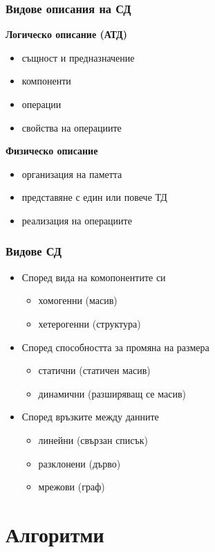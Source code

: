 \documentclass{beamer}
\begin{document}
\begin{frame}
  \frametitle{Видове описания на СД}

  \textbf{Логическо описание (АТД)}
  \begin{itemize}
  \item същност и предназначение
  \item компоненти
  \item операции
  \item свойства на операциите
  \end{itemize}
  \vspace{1em}
  \pause
  \textbf{Физическо описание}
  \begin{itemize}
  \item организация на паметта
  \item представяне с един или повече ТД
  \item реализация на операциите
  \end{itemize}
\end{frame}

\begin{frame}
  \frametitle{Видове СД}

  \begin{itemize}[<+->]
  \item Според вида на комопонентите си
    \begin{itemize}[<.->]
    \item хомогенни (масив)
    \item хетерогенни (структура)
    \end{itemize}
  \item Според способността за промяна на размера
    \begin{itemize}[<.->]
    \item статични (статичен масив)
    \item динамични (разширяващ се масив)
    \end{itemize}
  \item Според връзките между данните
    \begin{itemize}[<.->]
    \item линейни (свързан списък)
    \item разклонени (дърво)
    \item мрежови (граф)
    \end{itemize}
  \end{itemize}
\end{frame}

\section{Алгоритми}
\end{document}
